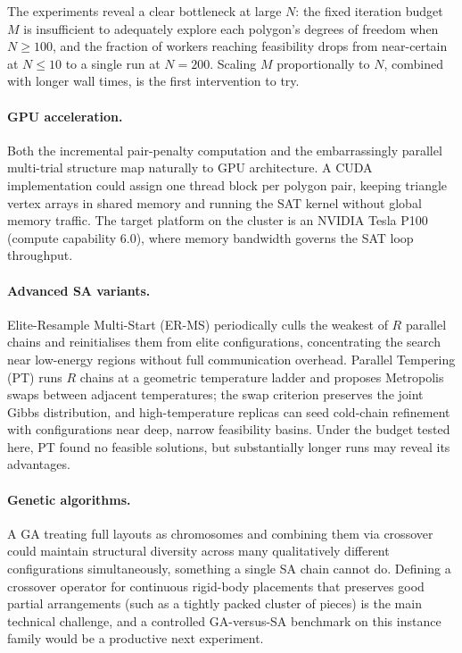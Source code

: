 \documentclass[10pt,twocolumn]{article}
\begin{document}
The experiments reveal a clear bottleneck at large $N$: the fixed
iteration budget $M$ is insufficient to adequately explore each polygon's
degrees of freedom when $N \geq 100$, and the fraction of workers
reaching feasibility drops from near-certain at $N \leq 10$ to a single
run at $N = 200$. Scaling $M$ proportionally to $N$, combined with
longer wall times, is the first intervention to try.

\paragraph{GPU acceleration.}
Both the incremental pair-penalty computation and the embarrassingly
parallel multi-trial structure map naturally to GPU architecture. A
CUDA implementation could assign one thread block per polygon pair,
keeping triangle vertex arrays in shared memory and running the SAT
kernel without global memory traffic. The target platform on the
cluster is an NVIDIA Tesla P100 (compute capability 6.0), where memory
bandwidth governs the SAT loop throughput.

\paragraph{Advanced SA variants.}
Elite-Resample Multi-Start (ER-MS) periodically culls the weakest of
$R$ parallel chains and reinitialises them from elite configurations,
concentrating the search near low-energy regions without full
communication overhead. Parallel Tempering (PT) runs $R$ chains at a
geometric temperature ladder and proposes Metropolis swaps between
adjacent temperatures; the swap criterion preserves the joint Gibbs
distribution, and high-temperature replicas can seed cold-chain
refinement with configurations near deep, narrow feasibility basins.
Under the budget tested here, PT found no feasible solutions, but
substantially longer runs may reveal its advantages.

\paragraph{Genetic algorithms.}
A GA treating full layouts as chromosomes and combining them via
crossover could maintain structural diversity across many qualitatively
different configurations simultaneously, something a single SA chain
cannot do. Defining a crossover operator for continuous rigid-body
placements that preserves good partial arrangements (such as a tightly
packed cluster of pieces) is the main technical challenge, and a
controlled GA-versus-SA benchmark on this instance family would be a
productive next experiment.
\end{document}
